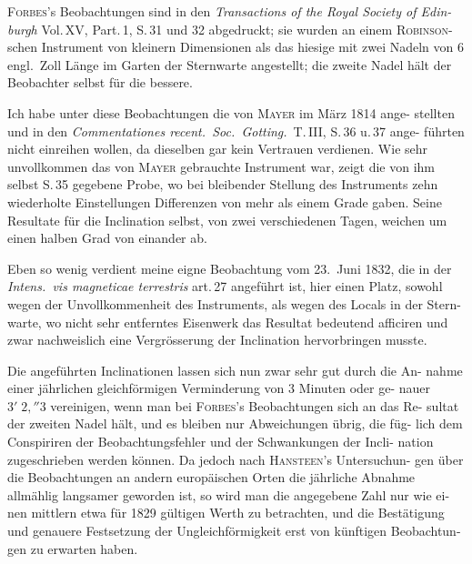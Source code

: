 \documentclass[12pt,a4paper]{article}
\begin{document}
\textsc{Forbes}'s Beobachtungen sind in den \textit{Transactions of the Royal Society of Edin-
burgh} Vol.\,XV, Part.\,1, S.\,31 und 32 abgedruckt; sie wurden an einem \textsc{Robinson}-
schen Instrument von kleinern Dimensionen als das hiesige mit zwei Nadeln von 
6 engl.\ Zoll Länge im Garten der Sternwarte angestellt; die zweite Nadel hält der 
Beobachter selbst für die bessere.

Ich habe unter diese Beobachtungen die von \textsc{Mayer} im März 1814 ange-
stellten und in den \textit{Commentationes recent.\ Soc.\ Gotting.}\ T.\,III, S.\,36 u.\,37 ange-
führten nicht einreihen wollen, da dieselben gar kein Vertrauen verdienen. Wie 
sehr unvollkommen das von \textsc{Mayer} gebrauchte Instrument war, zeigt die von ihm 
selbst S.\,35 gegebene Probe, wo bei bleibender Stellung des Instruments zehn 
wiederholte Einstellungen Differenzen von mehr als einem Grade gaben. Seine 
Resultate für die Inclination selbst, von zwei verschiedenen Tagen, weichen um 
einen halben Grad von einander ab.

Eben so wenig verdient meine eigne Beobachtung vom 23.\ Juni 1832, die 
in der \textit{Intens.\ vis magneticae terrestris} art.\,27 angeführt ist, hier einen Platz, sowohl 
wegen der Unvollkommenheit des Instruments, als wegen des Locals in der Stern-
warte, wo nicht sehr entferntes Eisenwerk das Resultat bedeutend afficiren und 
zwar nachweislich eine Vergrösserung der Inclination hervorbringen musste.

Die angeführten Inclinationen lassen sich nun zwar sehr gut durch die An-
nahme einer jährlichen gleichförmigen Verminderung von 3 Minuten oder ge-
nauer $3'\; 2{,}''3$ vereinigen, wenn man bei \textsc{Forbes}'s Beobachtungen sich an das Re-
sultat der zweiten Nadel hält, und es bleiben nur Abweichungen übrig, die füg-
lich dem Conspiriren der Beobachtungsfehler und der Schwankungen der Incli-
nation zugeschrieben werden können. Da jedoch nach \textsc{Hansteen}'s Untersuchun-
gen über die Beobachtungen an andern europäischen Orten die jährliche Abnahme 
allmählig langsamer geworden ist, so wird man die angegebene Zahl nur wie ei-
nen mittlern etwa für 1829 gültigen Werth zu betrachten, und die Bestätigung 
und genauere Festsetzung der Ungleichförmigkeit erst von künftigen Beobachtun-
gen zu erwarten haben.

\newpage
\end{document}
